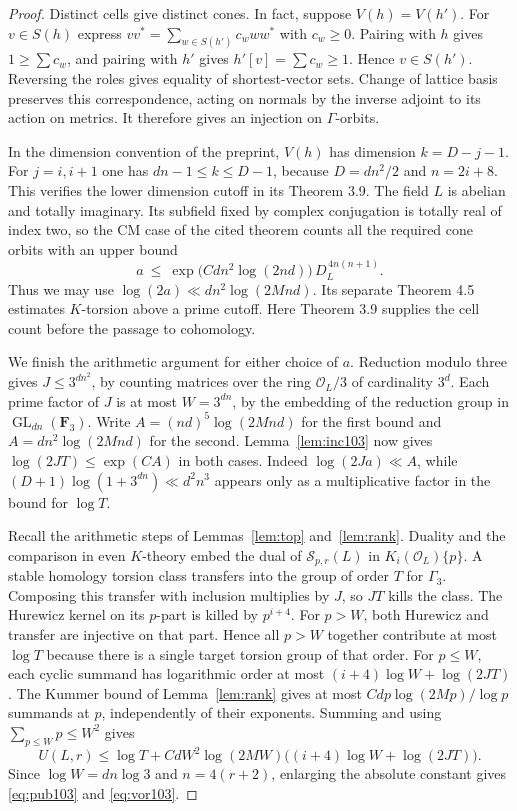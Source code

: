 \documentclass[a4paper,11pt]{article}
\theoremstyle{definition}
\theoremstyle{remark}
\numberwithin{equation}{section}
\newcommand{\Sel}{\mathcal S}
\newcommand{\GL}{\operatorname{GL}}
\newcommand{\OO}{\mathcal O}
\begin{document}
\begin{proof}
Distinct cells give distinct cones. In fact, suppose \(V(h)=V(h')\).
For \(v\in S(h)\) express \(vv^*=\sum_{w\in S(h')}c_w ww^*\)
with \(c_w\ge0\). Pairing with \(h\) gives
\(1\ge\sum c_w\), and pairing with \(h'\) gives
\(h'[v]=\sum c_w\ge1\). Hence \(v\in S(h')\). Reversing the
roles gives equality of shortest-vector sets. Change of lattice
basis preserves this correspondence, acting on normals by the
inverse adjoint to its action on metrics. It therefore gives an
injection on \(\Gamma\)-orbits.

In the dimension convention of the preprint, \(V(h)\) has
dimension \(k=D-j-1\). For \(j=i,i+1\) one has
\(dn-1\le k\le D-1\), because \(D=dn^2/2\) and \(n=2i+8\).
This verifies the lower dimension cutoff in its Theorem 3.9.
The field \(L\) is abelian and totally imaginary. Its subfield
fixed by complex conjugation is totally real of index two, so the
CM case of the cited theorem counts all the required cone orbits
with an upper bound
\[
 a\ \le\ \exp\!\big(Cdn^2\log(2nd)\big)\,D_L^{\,4n(n+1)} .
\]
Thus we may use \(\log(2a)\ll dn^2\log(2Mnd)\).
Its separate Theorem 4.5 estimates \(K\)-torsion above a
prime cutoff. Here Theorem 3.9 supplies the cell count before
the passage to cohomology.~\cite{IV-II-III-torre103}

We finish the arithmetic argument for either choice of \(a\).
Reduction modulo three gives \(J\le3^{dn^2}\), by counting
matrices over the ring \(\OO_L/3\) of cardinality \(3^d\).
Each prime factor of \(J\) is at most \(W=3^{dn}\), by the
embedding of the reduction group in \(\GL_{dn}(\mathbf F_3)\).
Write \(A=(nd)^5\log(2Mnd)\) for the first bound and
\(A=dn^2\log(2Mnd)\) for the second. Lemma~\ref{lem:inc103}
now gives \(\log(2JT)\le\exp(CA)\) in both cases. Indeed
\(\log(2Ja)\ll A\), while
\((D+1)\log(1+3^{dn})\ll d^2n^3\) appears only as a
multiplicative factor in the bound for \(\log T\).

Recall the arithmetic steps of Lemmas~\ref{lem:top}
and~\ref{lem:rank}. Duality and the comparison in even
\(K\)-theory embed the dual of \(\Sel_{p,r}(L)\) in
\(K_i(\OO_L)\{p\}\). A stable homology torsion class transfers
into the group of order \(T\) for \(\Gamma_3\). Composing this
transfer with inclusion multiplies by \(J\), so \(JT\) kills the class.
The Hurewicz kernel on its \(p\)-part is killed by \(p^{i+4}\).
For \(p>W\), both Hurewicz and transfer are injective on that
part. Hence all \(p>W\) together contribute at most \(\log T\)
because there is a single target torsion group of that order.
For \(p\le W\), each cyclic summand has logarithmic order at
most \((i+4)\log W+\log(2JT)\). The Kummer bound of
Lemma~\ref{lem:rank} gives at most
\(Cd p\log(2Mp)/\log p\) summands at \(p\), independently of
their exponents. Summing and using \(\sum_{p\le W}p\le W^2\)
gives
\[
 U(L,r)\le\log T+
 C dW^2\log(2MW)\big((i+4)\log W+\log(2JT)\big).
\]
Since \(\log W=dn\log3\) and \(n=4(r+2)\), enlarging the
absolute constant gives \eqref{eq:pub103} and \eqref{eq:vor103}.
\end{proof}
\end{document}
